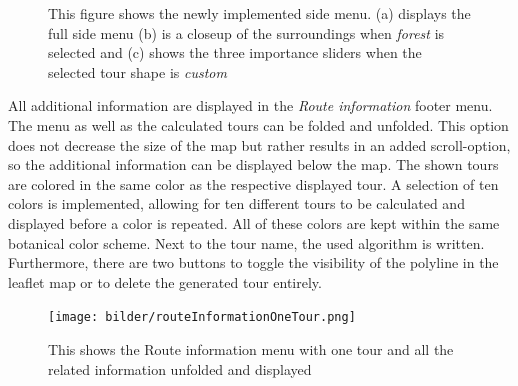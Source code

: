 \begin{figure}[H]
	\centering
	\usebox{\measurebox}\qquad\hfill
	\begin{minipage}[b][\ht\measurebox][s]{.5\textwidth}
		\centering
		
		\vfill
		
	\end{minipage}
	\caption{This figure shows the newly implemented side menu. (a) displays the full side menu (b) is a closeup of the surroundings when \textit{forest} is selected and (c) shows the three importance sliders when the selected tour shape is \textit{custom}}
	\label{fig:actualFrontendSideMenu}
\end{figure}

All additional information are displayed in the \textit{Route information} footer menu. 
The menu as well as the calculated tours can be folded and unfolded.
This option does not decrease the size of the map but rather results in an added scroll-option, so the additional information can be displayed below the map.
The shown tours are colored in the same color as the respective displayed tour. 
A selection of ten colors is implemented, allowing for ten different tours to be calculated and displayed before a color is repeated. 
All of these colors are kept within the same botanical color scheme.
Next to the tour name, the used algorithm is written.
Furthermore, there are two buttons to toggle the visibility of the polyline in the leaflet map or to delete the generated tour entirely.

\begin{figure}[H]
	\centering
	\texttt{[image: bilder/routeInformationOneTour.png]}
	\caption{This shows the Route information menu with one tour and all the related information unfolded and displayed}
	\label{fig:actualFrontendToureInfoMenuOneTour}
\end{figure}

